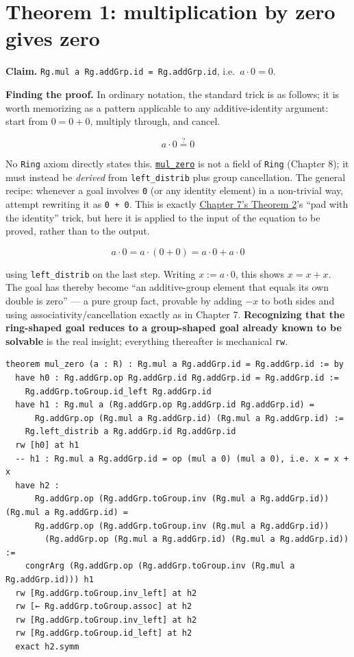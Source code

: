 \section{Theorem 1: multiplication by zero gives zero}\label{sec:09-ring-theorems:02-theorem-1:1}

\textbf{Claim.} \texttt{Rg.mul a Rg.addGrp.id = Rg.addGrp.id}, i.e.~\(a \cdot 0 = 0\).

\textbf{Finding the proof.} In ordinary notation, the standard trick is as follows; it is worth memorizing as a pattern applicable to any additive-identity argument: start from \(0 = 0 + 0\), multiply through, and cancel.

\[
a \cdot 0 \overset{?}{=} 0
\]

No \texttt{Ring} axiom directly states this. \href{https://loogle.lean-lang.org/?q=mul_zero}{\texttt{mul\_\allowbreak{}zero}} is not a field of \texttt{Ring} (Chapter 8); it must instead be \emph{derived} from \texttt{left\_\allowbreak{}distrib} plus group cancellation. The general recipe: whenever a goal involves \texttt{0} (or any identity element) in a non-trivial way, attempt rewriting it as \texttt{0 + 0}. This is exactly \hyperref[sec:07-group-theorems:03-theorem-2:1]{Chapter 7's Theorem 2}'s ``pad with the identity'' trick, but here it is applied to the input of the equation to be proved, rather than to the output.

\[
a \cdot 0 = a \cdot (0 + 0) = a\cdot 0 + a \cdot 0
\]

using \texttt{left\_\allowbreak{}distrib} on the last step. Writing \(x := a \cdot 0\), this shows \(x = x + x\). The goal has thereby become ``an additive-group element that equals its own double is zero'' --- a pure group fact, provable by adding \(-x\) to both sides and using associativity/cancellation exactly as in Chapter 7. \textbf{Recognizing that the ring-shaped goal reduces to a group-shaped goal already known to be solvable} is the real insight; everything thereafter is mechanical \texttt{rw}.

\begin{lstlisting}
theorem mul_zero (a : R) : Rg.mul a Rg.addGrp.id = Rg.addGrp.id := by
  have h0 : Rg.addGrp.op Rg.addGrp.id Rg.addGrp.id = Rg.addGrp.id :=
    Rg.addGrp.toGroup.id_left Rg.addGrp.id
  have h1 : Rg.mul a (Rg.addGrp.op Rg.addGrp.id Rg.addGrp.id) =
      Rg.addGrp.op (Rg.mul a Rg.addGrp.id) (Rg.mul a Rg.addGrp.id) :=
    Rg.left_distrib a Rg.addGrp.id Rg.addGrp.id
  rw [h0] at h1
  -- h1 : Rg.mul a Rg.addGrp.id = op (mul a 0) (mul a 0), i.e. x = x + x
  have h2 :
      Rg.addGrp.op (Rg.addGrp.toGroup.inv (Rg.mul a Rg.addGrp.id)) (Rg.mul a Rg.addGrp.id) =
      Rg.addGrp.op (Rg.addGrp.toGroup.inv (Rg.mul a Rg.addGrp.id))
        (Rg.addGrp.op (Rg.mul a Rg.addGrp.id) (Rg.mul a Rg.addGrp.id)) :=
    congrArg (Rg.addGrp.op (Rg.addGrp.toGroup.inv (Rg.mul a Rg.addGrp.id))) h1
  rw [Rg.addGrp.toGroup.inv_left] at h2
  rw [← Rg.addGrp.toGroup.assoc] at h2
  rw [Rg.addGrp.toGroup.inv_left] at h2
  rw [Rg.addGrp.toGroup.id_left] at h2
  exact h2.symm
\end{lstlisting}


